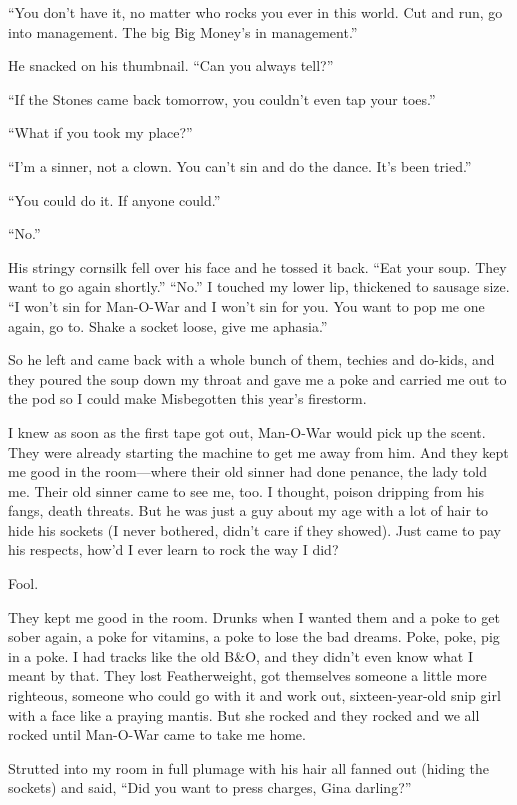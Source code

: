 ``You don't have it, no matter who rocks you ever in this world. Cut and run, go into management. The big Big Money's in management.''

He snacked on his thumbnail. ``Can you always tell?''

``If the Stones came back tomorrow, you couldn't even tap your toes.''

``What if you took my place?''

``I'm a sinner, not a clown. You can't sin and do the dance. It's been tried.''

``You could do it. If anyone could.''

``No.''

His stringy cornsilk fell over his face and he tossed it back. ``Eat your soup. They want to go again shortly.''
``No.'' I touched my lower lip, thickened to sausage size. ``I won't sin for Man-O-War and I won't sin for you. You want to pop me one again, go to. Shake a socket loose, give me aphasia.''

So he left and came back with a whole bunch of them, techies and do-kids, and they poured the soup down my throat and gave me a poke and carried me out to the pod so I could make Misbegotten this year's firestorm.

I knew as soon as the first tape got out, Man-O-War would pick up the scent. They were already starting the machine to get me away from him. And they kept me good in the room—where their old sinner had done penance, the lady told me. Their old sinner came to see me, too. I thought, poison dripping from his fangs, death threats. But he was just a guy about my age with a lot of hair to hide his sockets (I never bothered, didn't care if they showed). Just came to pay his respects, how'd I ever learn to rock the way I did?

Fool.

They kept me good in the room. Drunks when I wanted them and a poke to get sober again, a poke for vitamins, a poke to lose the bad dreams. Poke, poke, pig in a poke. I had tracks like the old B\&O, and they didn't even know what I meant by that. They lost Featherweight, got themselves someone a little more righteous, someone who could go with it and work out, sixteen-year-old snip girl with a face like a praying mantis. But she rocked and they rocked and we all rocked until Man-O-War came to take me home.

Strutted into my room in full plumage with his hair all fanned out (hiding the sockets) and said, ``Did you want to press charges, Gina darling?''

